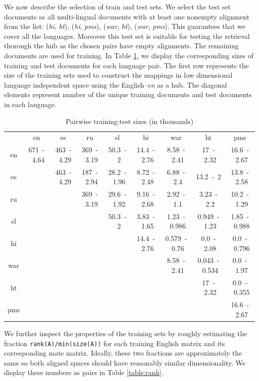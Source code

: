 \documentclass[twoside,11pt]{article}
\begin{document}
We now describe the selection of train and test sets. We select the test set documents as all multi-lingual documents with at least one nonempty alignment from the list: (\emph{hi}, \emph{ht}), (\emph{hi}, \emph{pms}), (\emph{war}, \emph{ht}), (\emph{war}, \emph{pms}). This guarantees that we cover all the languages. Moreover this test set is suitable for testing the retrieval thorough the hub as the chosen pairs have empty alignments. The remaining documents are used for training. In Table \ref{table:train_test}, we display the corresponding sizes of training and test documents for each language pair. The first row represents the size of the training sets used to construct the mappings in low dimensional language independent space using the English--\emph{en} as a hub. The diagonal elements represent number of the unique training documents and test documents in each language.

{
\renewcommand\tabcolsep{3pt}
\begin{table}[h!]
\caption{Pairwise training:test sizes (in thousands)}
\label{table:train_test}
{
\small
\begin{tabular}{c|c|c|c|c|c|c|c|c|}
&	en&	es&	ru&	sl&	hi&	war&	ht&	pms\\\cline{1-9}
en&	671~-~4.64&	463~-~4.29&	369~-~3.19&	50.3~-~2&	14.4~-~2.76&	8.58~-~2.41&	 17~-~2.32&	16.6~-~2.67\\
\cline{2-9}
es&	\multicolumn{1}{c|}{}	&	463~-~4.29&	187~-~2.94&	28.2~-~1.96&	8.72~-~2.48&	 6.88~-~2.4&	13.2~-~2&	 13.8~-~2.58\\
\cline{3-9}
ru&	\multicolumn{2}{c|}{}	&	369~-~3.19&	29.6~-~1.92&	9.16~-~2.68&	2.92~-~1.1&	 3.23~-~2.2&	10.2~-~1.29\\
\cline{4-9}
sl&	\multicolumn{3}{c|}{}	&	50.3~-~2&	3.83~-~1.65&	1.23~-~0.986&	0.949~-~1.23&	 1.85~-~0.988\\
\cline{5-9}
hi&	\multicolumn{4}{c|}{}	&	14.4~-~2.76&	0.579~-~0.76&	0.0~-~2.08&	0.0~-~0.796\\
\cline{6-9}
war&	\multicolumn{5}{c|}{}	&	8.58~-~2.41&	0.043~-~0.534&	0.0~-~1.97\\
\cline{7-9}
ht&	\multicolumn{6}{c|}{}	&	17~-~2.32&	0.0~-~0.355\\
\cline{8-9}
pms&	\multicolumn{7}{c|}{}	&	16.6~-~2.67\\
\cline{9-9}
\end{tabular}
}
\end{table}
}

We further inspect the properties of the training sets by roughly estimating the fraction \texttt{rank(A)/min(size(A))} for each training English matrix and its corresponding mate matrix. Ideally, these two fractions are approximately the same so  both aligned spaces should have reasonably similar dimensionality. We display these numbers as pairs in Table \ref{table:rank}.
\end{document}

